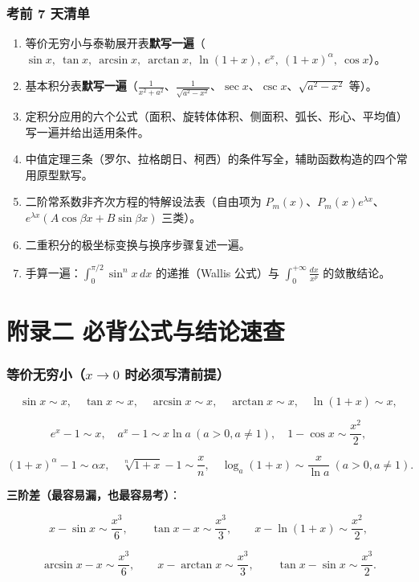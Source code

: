 \documentclass[11pt,openany,UTF8]{ctexbook}
\begin{document}
\subsection{考前 7 天清单}

\begin{enumerate}
\item 等价无穷小与泰勒展开表\textbf{默写一遍}（$\sin x,\ \tan x,\ \arcsin x,\ \arctan x,\ \ln(1+x),\ e^x,\ (1+x)^\alpha,\ \cos x$）。
\item 基本积分表\textbf{默写一遍}（$\frac{1}{x^2+a^2}$、$\frac{1}{\sqrt{a^2-x^2}}$、$\sec x$、$\csc x$、$\sqrt{a^2-x^2}$ 等）。
\item 定积分应用的六个公式（面积、旋转体体积、侧面积、弧长、形心、平均值）写一遍并给出适用条件。
\item 中值定理三条（罗尔、拉格朗日、柯西）的条件写全，辅助函数构造的四个常用原型默写。
\item 二阶常系数非齐次方程的特解设法表（自由项为 $P_m(x)$、$P_m(x)e^{\lambda x}$、$e^{\lambda x}(A\cos\beta x+B\sin\beta x)$ 三类）。
\item 二重积分的极坐标变换与换序步骤复述一遍。
\item 手算一遍：$\int_0^{\pi/2}\sin^n x\,dx$ 的递推（Wallis 公式）与 $\int_0^{+\infty}\frac{dx}{x^p}$ 的敛散结论。
\end{enumerate}
\chapter*{附录二 必背公式与结论速查}
\subsection{等价无穷小（$x\to 0$ 时必须写清前提）}

\[\sin x\sim x,\quad \tan x\sim x,\quad \arcsin x\sim x,\quad \arctan x\sim x,\quad \ln(1+x)\sim x,\]

\[e^x-1\sim x,\quad a^x-1\sim x\ln a\ (a>0,a\ne1),\quad 1-\cos x\sim \frac{x^2}{2},\]

\[(1+x)^{\alpha}-1\sim \alpha x,\quad \sqrt[n]{1+x}-1\sim \frac{x}{n},\quad \log_a(1+x)\sim \frac{x}{\ln a}\ (a>0,a\ne1).\]

\textbf{三阶差（最容易漏，也最容易考）}：

\[x-\sin x\sim \frac{x^3}{6},\qquad \tan x-x\sim \frac{x^3}{3},\qquad x-\ln(1+x)\sim \frac{x^2}{2},\]

\[\arcsin x-x\sim \frac{x^3}{6},\qquad x-\arctan x\sim \frac{x^3}{3},\qquad \tan x-\sin x\sim \frac{x^3}{2}.\]
\end{document}
